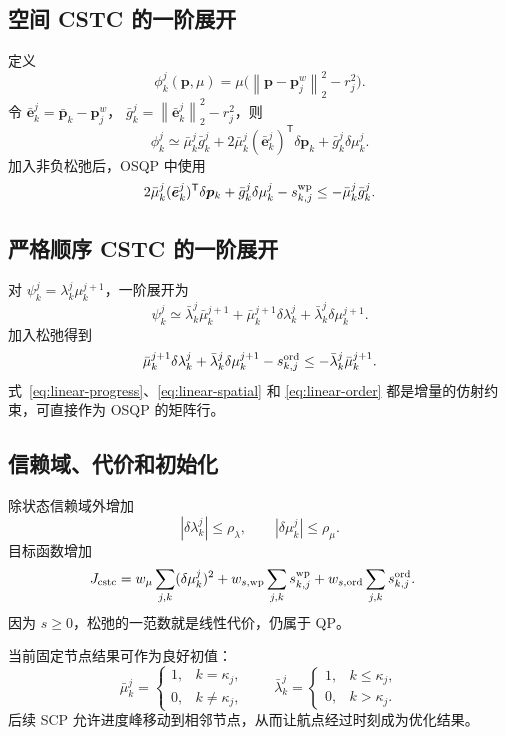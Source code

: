 \documentclass[UTF8,a4paper,11pt]{ctexart}
\newcommand{\nTwo}[1]{\left\lVert#1\right\rVert_2}
\begin{document}
\subsection{空间 CSTC 的一阶展开}

定义
\[
 \phi_k^j(\bm p,\mu)=\mu\big(\nTwo{\bm p-\bm p_j^w}^2-r_j^2\big).
\]
令 $\bar{\bm e}_k^j=\bar{\bm p}_k-\bm p_j^w$，
$\bar g_k^j=\nTwo{\bar{\bm e}_k^j}^2-r_j^2$，则
\[
 \phi_k^j\simeq
 \bar\mu_k^j\bar g_k^j+
 2\bar\mu_k^j(\bar{\bm e}_k^j)^\mathsf T\delta\bm p_k+
 \bar g_k^j\delta\mu_k^j.
\]
加入非负松弛后，OSQP 中使用
\begin{equation}
 2\bar\mu_k^j(\bar{\bm e}_k^j)^\mathsf T\delta\bm p_k+
 \bar g_k^j\delta\mu_k^j-s_{k,j}^{\rm wp}
 \leq-\bar\mu_k^j\bar g_k^j.
 \label{eq:linear-spatial}
\end{equation}

\subsection{严格顺序 CSTC 的一阶展开}

对 $\psi_k^j=\lambda_k^j\mu_k^{j+1}$，一阶展开为
\[
 \psi_k^j\simeq
 \bar\lambda_k^j\bar\mu_k^{j+1}
 +\bar\mu_k^{j+1}\delta\lambda_k^j
 +\bar\lambda_k^j\delta\mu_k^{j+1}.
\]
加入松弛得到
\begin{equation}
 \bar\mu_k^{j+1}\delta\lambda_k^j+
 \bar\lambda_k^j\delta\mu_k^{j+1}-s_{k,j}^{\rm ord}
 \leq-\bar\lambda_k^j\bar\mu_k^{j+1}.
 \label{eq:linear-order}
\end{equation}
式~\eqref{eq:linear-progress}、\eqref{eq:linear-spatial} 和
\eqref{eq:linear-order} 都是增量的仿射约束，可直接作为 OSQP 的矩阵行。

\subsection{信赖域、代价和初始化}

除状态信赖域外增加
\[
 |\delta\lambda_k^j|\leq\rho_\lambda,\qquad
 |\delta\mu_k^j|\leq\rho_\mu.
\]
目标函数增加
\begin{align}
 J_{\rm cstc}={}&w_\mu\sum_{j,k}(\delta\mu_k^j)^2
 +w_{s,\rm wp}\sum_{j,k}s_{k,j}^{\rm wp}
 +w_{s,\rm ord}\sum_{j,k}s_{k,j}^{\rm ord}.
 \label{eq:cstc-cost}
\end{align}
因为 $s\geq0$，松弛的一范数就是线性代价，仍属于 QP。

当前固定节点结果可作为良好初值：
\[
 \bar\mu_k^j=\begin{cases}1,&k=\kappa_j,\\0,&k\neq\kappa_j,\end{cases}
 \qquad
 \bar\lambda_k^j=\begin{cases}1,&k\leq\kappa_j,\\0,&k>\kappa_j.\end{cases}
\]
后续 SCP 允许进度峰移动到相邻节点，从而让航点经过时刻成为优化结果。
\end{document}
